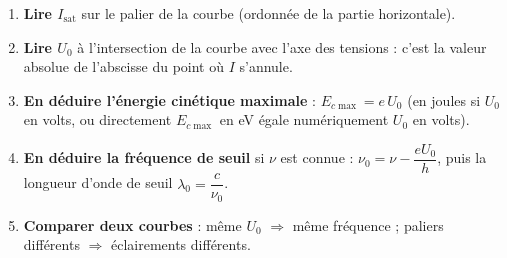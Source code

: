 \documentclass[11pt]{article}
\begin{document}
\begin{methode}[Exploiter une caractéristique $I = f(U)$]
\begin{enumerate}
\item \textbf{Lire $I_{\text{sat}}$} sur le palier de la courbe (ordonnée de la partie horizontale).
\item \textbf{Lire $U_0$} à l'intersection de la courbe avec l'axe des tensions : c'est la valeur absolue de l'abscisse du point où $I$ s'annule.
\item \textbf{En déduire l'énergie cinétique maximale} : $E_{c\max} = e\,U_0$ (en joules si $U_0$ en volts, ou directement $E_{c\max}$ en eV égale numériquement $U_0$ en volts).
\item \textbf{En déduire la fréquence de seuil} si $\nu$ est connue : $\nu_0 = \nu - \dfrac{eU_0}{h}$, puis la longueur d'onde de seuil $\lambda_0 = \dfrac{c}{\nu_0}$.
\item \textbf{Comparer deux courbes} : même $U_0$ $\Rightarrow$ même fréquence ; paliers différents $\Rightarrow$ éclairements différents.
\end{enumerate}
\end{methode}
\end{document}
